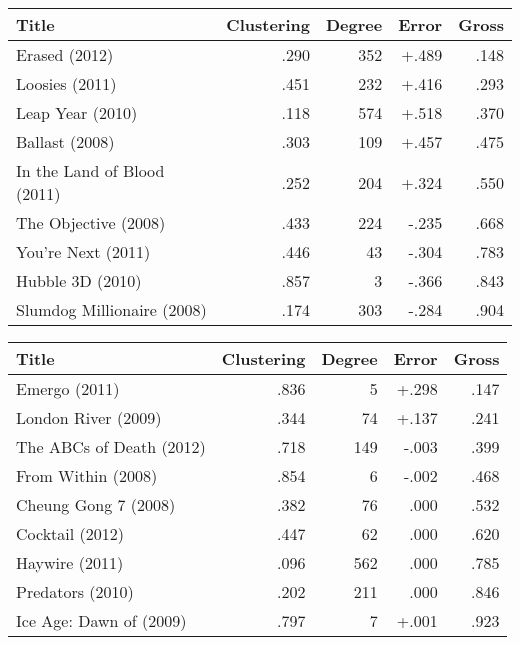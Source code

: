 \begin{table*}[!t]
\caption{\label{tab:errors_pred_gross}Errors in predictive results for gross.}
\centering

\begin{subtable}[b]{\textwidth}
\caption{\textbf{Predictor Misses}}
\centering
\begin{tabular}{lrrrr} \toprule
Title                       & Clustering & Degree & Error  & Gross \\ \midrule
Erased (2012)               & .290       & 352    & +.489  & .148  \\
Loosies (2011)              & .451       & 232    & +.416  & .293  \\
Leap Year (2010)            & .118       & 574    & +.518  & .370  \\
Ballast (2008)              & .303       & 109    & +.457  & .475  \\
In the Land of Blood (2011) & .252       & 204    & +.324  & .550  \\
The Objective (2008)        & .433       & 224    & -.235  & .668  \\
You're Next (2011)          & .446       & 43     & -.304  & .783  \\
Hubble 3D (2010)            & .857       & 3      & -.366  & .843  \\
Slumdog Millionaire (2008)  & .174       & 303    & -.284  & .904  \\ \bottomrule
\end{tabular}
\end{subtable}

\vspace*{.5 cm}

\begin{subtable}[b]{\textwidth}
\caption{\textbf{Predictor Hits}}
\centering
\begin{tabular}{lrrrr} \toprule
Title                    & Clustering & Degree & Error & Gross \\ \midrule
Emergo (2011)            & .836       & 5      & +.298 & .147  \\
London River (2009)      & .344       & 74     & +.137 & .241  \\
The ABCs of Death (2012) & .718       & 149    & -.003 & .399  \\
From Within (2008)       & .854       & 6      & -.002 & .468  \\
Cheung Gong 7 (2008)     & .382       & 76     &  .000 & .532  \\
Cocktail (2012)          & .447       & 62     &  .000 & .620  \\
Haywire (2011)           & .096       & 562    &  .000 & .785  \\
Predators (2010)         & .202       & 211    &  .000 & .846  \\
Ice Age: Dawn of (2009)  & .797       & 7      & +.001 & .923  \\ \bottomrule
\end{tabular}
\end{subtable}

\end{table*}
